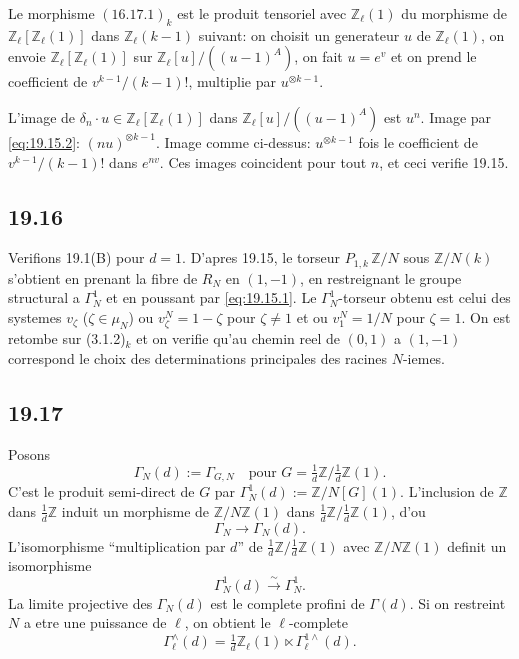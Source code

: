 \documentclass[12pt,a4paper]{article}
\theoremstyle{plain}
\theoremstyle{definition}
\theoremstyle{remark}
\newcommand{\ZZ}{\mathbb{Z}}
\begin{document}
Le morphisme $(16.17.1)_k$ est le produit tensoriel avec
$\ZZ_\ell(1)$ du morphisme de $\ZZ_\ell[\ZZ_\ell(1)]$ dans
$\ZZ_\ell(k-1)$ suivant: on choisit un generateur $u$ de
$\ZZ_\ell(1)$, on envoie $\ZZ_\ell[\ZZ_\ell(1)]$ sur
$\ZZ_\ell[u]/((u-1)^A)$, on fait $u = e^v$ et on prend le coefficient
de $v^{k-1}/(k-1)!$, multiplie par $u^{\otimes k-1}$.

L'image de $\delta_n \cdot u \in \ZZ_\ell[\ZZ_\ell(1)]$ dans
$\ZZ_\ell[u]/((u-1)^A)$ est $u^n$. Image par
\eqref{eq:19.15.2}: $(nu)^{\otimes k-1}$. Image comme ci-dessus:
$u^{\otimes k-1}$ fois le coefficient de $v^{k-1}/(k-1)!$ dans
$e^{nv}$. Ces images coincident pour tout $n$, et ceci verifie
19.15.

\subsection{19.16}

Verifions 19.1(B) pour $d=1$. D'apres 19.15, le torseur
$P_{1,k}\, \ZZ/N$ sous $\ZZ/N(k)$ s'obtient en prenant la fibre de
$R_N$ en $(1,-1)$, en restreignant le groupe structural a
$\Gamma_N^1$ et en poussant par \eqref{eq:19.15.1}. Le
$\Gamma_N^1$-torseur obtenu est celui des systemes $v_\zeta$
($\zeta \in \mu_N$) ou $v_\zeta^N = 1-\zeta$ pour $\zeta \neq 1$ et
ou $v_1^N = 1/N$ pour $\zeta = 1$. On est retombe sur (3.1.2)$_k$ et
on verifie qu'au chemin reel de $(0,1)$ a $(1,-1)$ correspond le choix
des determinations principales des racines $N$-iemes.

\subsection{19.17}

Posons
\[
\Gamma_N(d) := \Gamma_{G,N} \quad \text{pour } G =
\tfrac{1}{d}\ZZ/\tfrac{1}{d}\ZZ(1).
\]
C'est le produit semi-direct de $G$ par $\Gamma_N^1(d) :=
\ZZ/N[G](1)$. L'inclusion de $\ZZ$ dans $\frac{1}{d}\ZZ$ induit un
morphisme de $\ZZ/N\ZZ(1)$ dans
$\frac{1}{d}\ZZ/\frac{1}{d}\ZZ(1)$, d'ou
\begin{equation}\label{eq:19.17.1}
\Gamma_N \to \Gamma_N(d).
\end{equation}
L'isomorphisme ``multiplication par $d$'' de
$\frac{1}{d}\ZZ/\frac{1}{d}\ZZ(1)$ avec $\ZZ/N\ZZ(1)$ definit un
isomorphisme
\begin{equation}\label{eq:19.17.2}
\Gamma_N^1(d) \xrightarrow{\sim} \Gamma_N^1.
\end{equation}
La limite projective des $\Gamma_N(d)$ est le complete profini de
$\Gamma(d)$. Si on restreint $N$ a etre une puissance de $\ell$, on
obtient le $\ell$-complete
\[
\Gamma_\ell^\wedge(d) = \tfrac{1}{d}\ZZ_\ell(1) \ltimes
\Gamma_\ell^{1\wedge}(d).
\]
\end{document}
